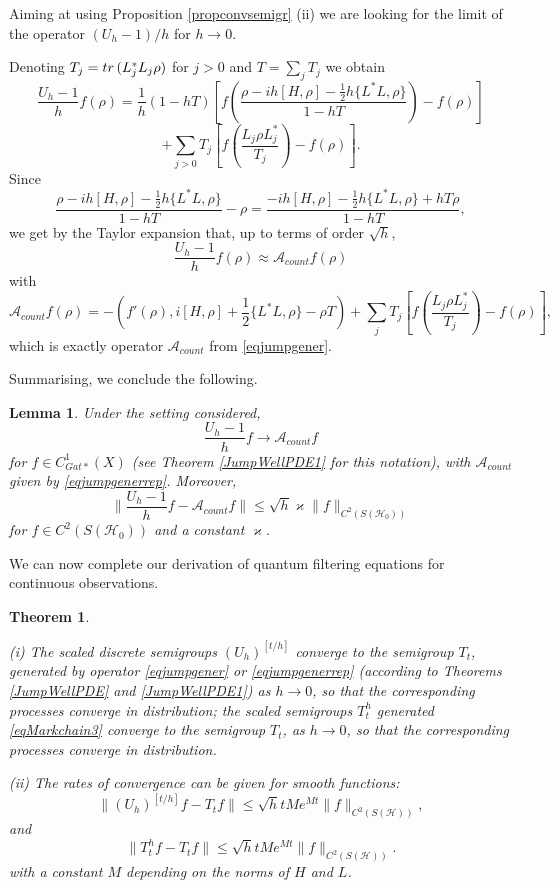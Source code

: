 \documentclass[10pt,a4paper]{amsart}
\def\AC{\mathcal{A}}
\def\HC{\mathcal{H}}
\def\tr{\rm{tr}}
\def\ka{\varkappa}
\newtheorem{theorem}{Theorem}[section]
\newtheorem{lemma}{Lemma}[section]
\begin{document}
Aiming at using Proposition \ref{propconvsemigr} (ii) we are looking for
the limit of the operator $(U_h-1)/h$ for $h \to 0$.

Denoting $T_j=  {\tr}\, (L_j^*L_j \rho)$ for $j>0$ and $T=\sum_j T_j$ we obtain
\[
\frac{U_h-1}{h} f(\rho)=\frac{1}{h} (1-hT)
\left[f \left( \frac{\rho -ih[H, \rho] -\frac12 h\{L^*L,\rho\}}{1-h T}\right)-f(\rho)\right]
\]
\[
+\sum_{j>0} T_j \left[f(\frac{L_j\rho L_j^*}{T_j})-f(\rho)\right].
\]
Since
\[
\frac{\rho -ih[H, \rho] -\frac12 h\{L^*L,\rho\}}{1-h T}-\rho
=\frac{-ih[H, \rho] -\frac12 h\{L^*L,\rho\}+h T \rho}{1-h T},
\]
we get by the Taylor expansion that, up to terms of order $\sqrt h$,
\[
\frac{U_h-1}{h} f(\rho)\approx \AC_{count} f(\rho)
\]
with
\begin{equation}
\label{eqjumpgenerrep}
\AC_{count}f(\rho)=-(f'(\rho), i[H, \rho] +\frac12 \{L^*L,\rho\}-\rho T)
+\sum_j T_j \left[f(\frac{L_j\rho L_j^*}{T_j})-f(\rho)\right],
\end{equation}
which is exactly operator $\AC_{count}$ from \eqref{eqjumpgener}.

Summarising, we conclude the following.

\begin{lemma}
\label{lemmaongencount}
Under the setting considered,
\begin{equation}
\label{eqjumpgener0}
\frac{U_h-1}{h} f \to \AC_{count}f
\end{equation}
for $f\in C^1_{Gat*}(X)$ (see Theorem \ref{JumpWellPDE1} for this notation),
with $\AC_{count}$ given by \eqref{eqjumpgenerrep}. Moreover,
\begin{equation}
\label{eqjumpgener1}
\|\frac{U_h-1}{h} f -\AC_{count}f\|\le \sqrt h \ka \|f\|_{C^2(S(\HC_0))}
\end{equation}
for $f\in C^2(S(\HC_0))$ and a constant $\ka$.
\end{lemma}

We can now complete our derivation of quantum filtering equations for continuous observations.


\begin{theorem}
\label{thBeleqcount}

(i) The scaled discrete semigroups $(U_h)^{[t/h]}$ converge to the semigroup $T_t$,
generated by operator \eqref{eqjumpgener} or \eqref{eqjumpgenerrep}
(according to Theorems \ref{JumpWellPDE} and \ref{JumpWellPDE1})
as $h\to 0$, so that the corresponding
processes converge in distribution; the scaled semigroups $T_t^h$ generated
 \eqref{eqMarkchain3} converge to the semigroup $T_t$, as $h\to 0$,
so that the corresponding
processes converge in distribution.

(ii) The rates of convergence can be given for smooth functions:
\begin{equation}
\label{eq1thBeleqcount}
\|(U_h)^{[t/h]}f -T_tf\| \le \sqrt h t M e^{Mt} \|f\|_{C^2(S(\HC))},
\end{equation}
and
\begin{equation}
\label{eq2thBeleqcount}
\|T_t^h f -T_tf\| \le \sqrt h t Me^{Mt} \|f\|_{C^2(S(\HC))}.
\end{equation}
with a constant $M$ depending on the norms of $H$ and $L$.
\end{theorem}
\end{document}
